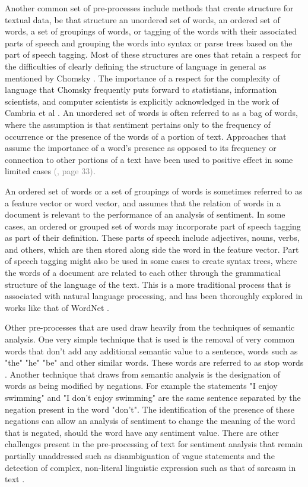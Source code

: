 \documentclass[letterpaper, 10 pt, conference]{ieeeconf}
\begin{document}
Another common set of pre-processes include methods that create structure for textual data, be that structure an unordered set of words, an ordered set of words, a set of groupings of words, or tagging of the words with their associated parts of speech and grouping the words into syntax or parse trees based on the part of speech tagging. Most of these structures are ones that retain a respect for the difficulties of clearly defining the structure of language in general as mentioned by Chomsky \textcolor{gray}{\cite{Chomsky}}. The importance of a respect for the complexity of language that Chomsky frequently puts forward to statistians, information scientists, and computer scientists is explicitly acknowledged in the work of Cambria et al \textcolor{gray}{\cite{CambriaPoria}}. An unordered set of words is often referred to as a bag of words, where the assumption is that sentiment pertains only to the frequency of occurrence or the presence of the words of a portion of text. Approaches that assume the importance of a word's presence as opposed to its frequency or connection to other portions of a text have been used to positive effect in some limited cases \textcolor{gray}{(\cite{PangLee}, page 33)}.

An ordered set of words or a set of groupings of words is sometimes referred to as a feature vector or word vector, and assumes that the relation of words in a document is relevant to the performance of an analysis of sentiment. In some cases, an ordered or grouped set of words may incorporate part of speech tagging as part of their definition. These parts of speech include adjectives, nouns, verbs, and others, which are then stored along side the word in the feature vector. Part of speech tagging might also be used in some cases to create syntax trees, where the words of a document are related to each other through the grammatical structure of the language of the text. This is a more traditional process that is associated with natural language processing, and has been thoroughly explored in works like that of WordNet \textcolor{gray}{\cite{WordNet}}.

Other pre-processes that are used draw heavily from the techniques of semantic analysis. One very simple technique that is used is the removal of very common words that don't add any additional semantic value to a sentence, words such as "the" "he" "be" and other similar words. These words are referred to as stop words \textcolor{gray}{\cite{Manning}}. Another technique that draws from semantic analysis is the designation of words as being modified by negations. For example the statements "I enjoy swimming" and "I don't enjoy swimming" are the same sentence separated by the negation present in the word "don't". The identification of the presence of these negations can allow an analysis of sentiment to change the meaning of the word that is negated, should the word have any sentiment value. There are other challenges present in the pre-processing of text for sentiment analysis that remain partially unaddressed such as disambiguation of vague statements and the detection of complex, non-literal linguistic expression such as that of sarcasm in text \textcolor{gray}{\cite{RaviRavi}}.
\end{document}
